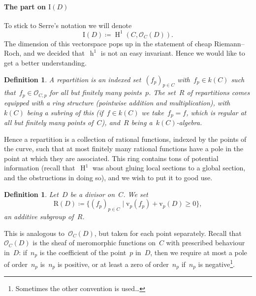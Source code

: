 \documentclass[10pt,a4paper]{article}
\theoremstyle{lecture}
\newtheorem{definition}[theorem]{Definition}
\newcommand\dash{\nobreakdash-\hspace{0pt}}
\DeclareMathOperator\hh{h}
\DeclareMathOperator\HH{H}
\begin{document}
\paragraph{The part on $\mathrm{I}(D)$}
To stick to Serre's notation we will denote
\begin{equation}
  \mathrm{I}(D)\coloneqq\HH^1(C,\mathcal{O}_C(D)).
\end{equation}
The dimension of this vectorspace pops up in the statement of cheap Riemann--Roch, and we decided that~$\hh^1$ is not an easy invariant. Hence we would like to get a better understanding.
\begin{definition}
  A \emph{repartition} is an indexed set~$(f_p)_{p\in C}$ with~$f_p\in k(C)$ such that~$f_p\in\mathcal{O}_{C,p}$ for all but finitely many points~$p$. The set~$R$ of repartitions comes equipped with a ring structure (pointwise addition and multiplication), with~$k(C)$ being a subring of this (if~$f\in k(C)$ we take~$f_p=f$, which is regular at all but finitely many points of~$C$), and~$R$ being a~$k(C)$\dash algebra.
\end{definition}
Hence a repartition is a collection of rational functions, indexed by the points of the curve, such that at most finitely many rational functions have a pole in the point at which they are associated. This ring contains tons of potential information (recall that~$\HH^1$ was about gluing local sections to a global section, and the obstructions in doing so), and we wish to put it to good use.
\begin{definition}
  Let~$D$ be a divisor on~$C$. We set
  \begin{equation}
    \mathrm{R}(D)\coloneqq\{(f_p)_{p\in C}\mid \mathrm{v}_p(f_p)+\mathrm{v}_p(D)\geq 0\},
  \end{equation}
  an additive subgroup of~$R$.
\end{definition}
This is analogous to~$\mathcal{O}_C(D)$, but taken for each point separately. Recall that~$\mathcal{O}_C(D)$ is the sheaf of meromorphic functions on~$C$ with prescribed behaviour in~$D$: if~$n_p$ is the coefficient of the point~$p$ in~$D$, then we require at most a pole of order~$n_p$ is~$n_p$ is positive, or at least a zero of order~$n_p$ if~$n_p$ is negative\footnote{Sometimes the other convention is used\dots}.
\end{document}
